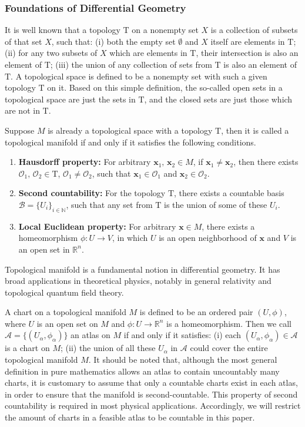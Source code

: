 \subsubsection{Foundations of Differential Geometry}
\par It is well known that a topology $\mathrm{T}$ on a nonempty set $X$ is a collection of subsets of that set $X$, such that: (i) both the empty set $\emptyset$ and $X$ itself are elements in $\mathrm{T}$; (ii) for any two subsets of $X$ which are elements in $\mathrm{T}$, their intersection is also an element of $\mathrm{T}$; (iii) the union of any collection of sets from $\mathrm{T}$ is also an element of $\mathrm{T}$. A topological space is defined to be a nonempty set with such a given topology $\mathrm{T}$ on it. Based on this simple definition, the so-called open sets in a topological space are just the sets in $\mathrm{T}$, and the closed sets are just those which are not in $\mathrm{T}$. 
\par Suppose $M$ is already a topological space with a topology $\mathrm{T}$, then it is called a topological manifold if and only if it satisfies the following conditions.
\begin{enumerate}[label=(\roman*)]
    \item \textbf{Hausdorff property:} For arbitrary $\mathbf{x}_{1},\,\mathbf{x}_{2}\in M$, if $\mathbf{x}_{1}\neq\mathbf{x}_{2}$, then there exists $\mathcal{O}_{1},\,\mathcal{O}_{2}\in\mathrm{T}$, $\mathcal{O}_1\neq\mathcal{O}_{2}$, such that $\mathbf{x}_{1}\in\mathcal{O}_{1}$ and $\mathbf{x}_{2}\in\mathcal{O}_{2}$.
    \item \textbf{Second countability:} For the topology $\mathrm{T}$, there exists a countable basis $\mathcal{B}=\{U_{i}\}_{i\in\mathbb{N}}$, such that any set from $\mathrm{T}$ is the union of some of these $U_{i}$.
    \item \textbf{Local Euclidean property:} For arbitrary $\mathbf{x}\in M$, there exists a homeomorphism $\phi:U\rightarrow V$, in which $U$ is an open neighborhood of $\mathbf{x}$ and $V$ is an open set in $\mathbb{R}^{n}$.
\end{enumerate}
Topological manifold is a fundamental notion in differential geometry. It has broad applications in theoretical physics, notably in general relativity and topological quantum field theory.
\par A chart on a topological manifold $M$ is defined to be an ordered pair $\left(U,\phi\right)$, where $U$ is an open set on $M$ and $\phi:U\rightarrow\mathbb{R}^{n}$ is a homeomorphism. Then we call $\mathcal{A}=\{\left(U_{\alpha},\phi_{\alpha}\right)\}$ an atlas on $M$ if and only if it satisfies: (i) each $\left(U_{\alpha},\phi_{\alpha}\right)\in\mathcal{A}$ is a chart on $M$; (ii) the union of all these $U_{\alpha}$ in $\mathcal{A}$ could cover the entire topological manifold $M$. It should be noted that, although the most general definition in pure mathematics allows an atlas to contain uncountably many charts, it is customary to assume that only a countable charts exist in each atlas, in order to ensure that the manifold is second-countable. This property of second countability is required in most physical applications. Accordingly, we will restrict the amount of charts in a feasible atlas to be countable in this paper.
